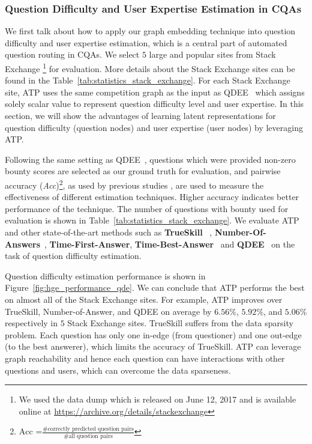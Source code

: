\documentclass[letterpaper]{article} \usepackage{aaai19}  \usepackage{times}  \usepackage{helvet}  \usepackage{courier}  \usepackage{url}  \usepackage{graphicx}  \usepackage{booktabs} \usepackage{xcolor}
\begin{document}
\subsubsection{Question Difficulty and User Expertise Estimation in CQAs}

We first talk about how to apply our graph embedding technique into question difficulty and user expertise estimation, which is a central part of automated question routing in CQAs. We select $5$ large and popular sites from Stack Exchange \footnote{We used the data dump which is released on June 12, 2017 and is available online at \url{https://archive.org/details/stackexchange}} for evaluation. More details about the Stack Exchange sites can be found in the Table~\ref{tab:statistics_stack_exchange}. For each Stack Exchange site, ATP uses the same competition graph as the input as QDEE~\cite{QDEE2018} which assigns solely scalar value to represent question difficulty level and user expertise. In this section, we will show the advantages of learning latent representations for question difficulty (question nodes) and user expertise (user nodes) by leveraging ATP. 









 Following the same setting as QDEE~\cite{QDEE2018}, questions which were provided non-zero bounty scores are selected as our ground truth for evaluation, and pairwise accuracy (\textit{Acc})\footnote{$\textrm{Acc =} \frac{\textrm{\# correctly predicted question pairs}}{\textrm{\# all question pairs}}$}, as used by previous studies \cite{wang2014,QDEE2018}, are used to measure the effectiveness of different estimation techniques. Higher accuracy indicates better performance of the technique. The number of questions with bounty used for evaluation is shown in Table~\ref{tab:statistics_stack_exchange}. We evaluate ATP and other state-of-the-art methods such as {\bf TrueSkill} ~\cite{wang2014}, {\bf Number-Of-Answers}~\cite{yang2014sparrows}, {\bf Time-First-Answer},  {\bf Time-Best-Answer}~\cite{Huna2016} and {\bf QDEE}~\cite{QDEE2018} on the task of question difficulty estimation. 

Question difficulty estimation performance is shown in Figure~\ref{fig:hge_performance_qde}.
We can conclude that { ATP} performs the best on almost all of the Stack Exchange sites. For example, { ATP} improves over { TrueSkill}, { Number-of-Answer}, and { QDEE} on average by $6.56\%$, $5.92\%$, and $5.06\%$ respectively in $5$ Stack Exchange sites. { TrueSkill} suffers from the data sparsity problem. Each question has only one in-edge (from questioner) and one out-edge (to the best answerer), which limits the accuracy of { TrueSkill}. { ATP} can leverage graph reachability and hence each question can have interactions with other questions and users, which can overcome the data sparseness. 
\end{document}
